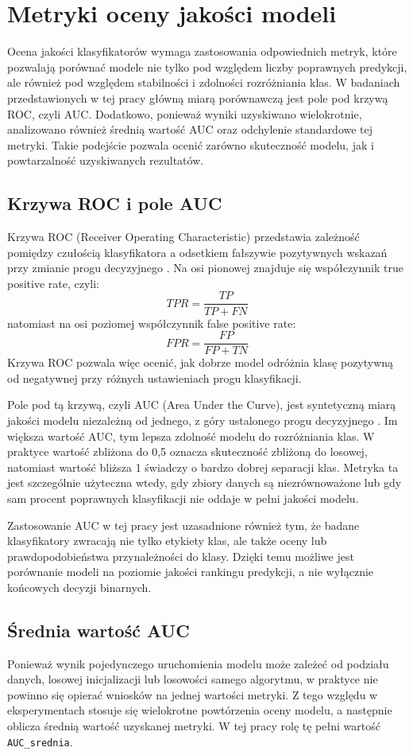 {\section{Metryki oceny jakości modeli}
Ocena jakości klasyfikatorów wymaga zastosowania odpowiednich metryk, które pozwalają porównać modele nie tylko pod względem liczby poprawnych predykcji, ale również pod względem stabilności i zdolności rozróżniania klas. W badaniach przedstawionych w tej pracy główną miarą porównawczą jest pole pod krzywą ROC, czyli AUC. Dodatkowo, ponieważ wyniki uzyskiwano wielokrotnie, analizowano również średnią wartość AUC oraz odchylenie standardowe tej metryki. Takie podejście pozwala ocenić zarówno skuteczność modelu, jak i powtarzalność uzyskiwanych rezultatów.

\subsection{Krzywa ROC i pole AUC}
Krzywa ROC (Receiver Operating Characteristic) przedstawia zależność pomiędzy czułością klasyfikatora a odsetkiem fałszywie pozytywnych wskazań przy zmianie progu decyzyjnego \cite{SklearnRocCurve}. Na osi pionowej znajduje się współczynnik true positive rate, czyli:
\[
TPR = \frac{TP}{TP + FN}
\]
natomiast na osi poziomej współczynnik false positive rate:
\[
FPR = \frac{FP}{FP + TN}
\]
Krzywa ROC pozwala więc ocenić, jak dobrze model odróżnia klasę pozytywną od negatywnej przy różnych ustawieniach progu klasyfikacji.

Pole pod tą krzywą, czyli AUC (Area Under the Curve), jest syntetyczną miarą jakości modelu niezależną od jednego, z góry ustalonego progu decyzyjnego \cite{SklearnRocAuc}. Im większa wartość AUC, tym lepsza zdolność modelu do rozróżniania klas. W praktyce wartość zbliżona do 0{,}5 oznacza skuteczność zbliżoną do losowej, natomiast wartość bliższa 1 świadczy o bardzo dobrej separacji klas. Metryka ta jest szczególnie użyteczna wtedy, gdy zbiory danych są niezrównoważone lub gdy sam procent poprawnych klasyfikacji nie oddaje w pełni jakości modelu.

Zastosowanie AUC w tej pracy jest uzasadnione również tym, że badane klasyfikatory zwracają nie tylko etykiety klas, ale także oceny lub prawdopodobieństwa przynależności do klasy. Dzięki temu możliwe jest porównanie modeli na poziomie jakości rankingu predykcji, a nie wyłącznie końcowych decyzji binarnych.

\subsection{Średnia wartość AUC}
Ponieważ wynik pojedynczego uruchomienia modelu może zależeć od podziału danych, losowej inicjalizacji lub losowości samego algorytmu, w praktyce nie powinno się opierać wniosków na jednej wartości metryki. Z tego względu w eksperymentach stosuje się wielokrotne powtórzenia oceny modelu, a następnie oblicza średnią wartość uzyskanej metryki. W tej pracy rolę tę pełni wartość \texttt{AUC\_srednia}.

}
